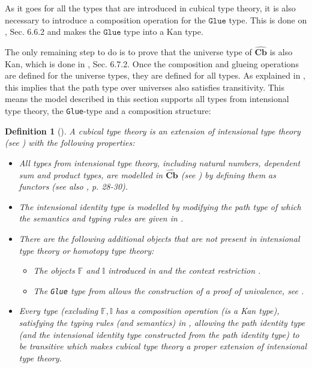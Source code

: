 \documentclass[12pt,a4paper,twoside,xetex]{book} %
\newcommand{\keyword}[1]{\emph{#1}\index{#1}}
\newtheorem{definition}[theorem]{Definition}
\newcommand{\psh}[1]{\widehat{#1}}
\newcommand{\op}[1]{\mathtt{#1}}
\newcommand{\cube}[0]{\textbf{Cb}}
\begin{document}
As it goes for all the types that are introduced in cubical type theory, it is 
also necessary to introduce a composition operation for the $\op{Glue}$ type. 
This is done on \cite{Huber2016}, Sec. 6.6.2 and makes the $\op{Glue}$ type 
into a Kan type.

The only remaining step to do is to prove that the universe type of $\psh{\cube}$ is also Kan, 
which is done in \cite{Huber2016}, Sec. 6.7.2. Once the composition and 
glueing operations are defined for the universe types, they are defined for all 
types. As explained in , this implies that the path type 
over universes also satisfies transitivity. This means the model described in 
this section supports all types from intensional type theory, the 
\texttt{Glue}-type and a composition structure:

\begin{definition}[\cite{Huber2016}]\label{ctt}
A \keyword{cubical type theory} is an 
extension of intensional type theory (see ) with the following 
properties:
\begin{itemize}
 \item All types from intensional type theory, including natural numbers, 
dependent sum and product types, are modelled in $\psh{\cube}$ (see ) by defining them as functors (see also \cite{Huber2016}, 
p. 28-30).
 
 \item The intensional identity type is modelled by modifying the path type of 
which the semantics and typing rules are given in .
 
 \item There are the following additional objects that are not present in intensional 
type theory or homotopy type theory:
 
 \begin{itemize}
 \item The objects $\mathbb{F}$ and $\mathbb{I}$ introduced in 
 and the context restriction 
.
  \item The \texttt{Glue} type from  allows the construction of a 
proof of univalence, see .
 
 \end{itemize}
 \item Every type (excluding \(\mathbb{F}, \mathbb{I}\) has a composition operation (is a Kan type), 
satisfying the typing rules (and semantics) in , allowing the path identity type (and the intensional identity type constructed from the path identity type) to be transitive which makes cubical type theory a proper 
extension of intensional type theory.
\end{itemize} 
\end{definition}
\end{document}
